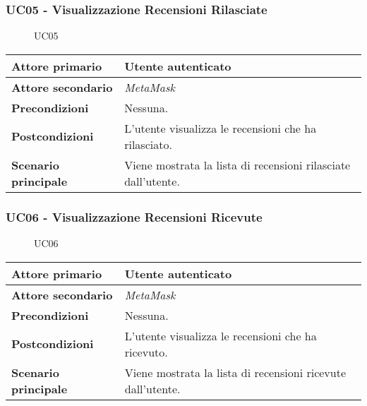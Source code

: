 \subsubsection{UC05 - Visualizzazione Recensioni Rilasciate}
\label{UC05}

\begin{figure}[H]
    \centering
    
    \caption{UC05}
 \end{figure}

\begin{center}
\renewcommand{\arraystretch}{1.5}
\begin{tabular}{ | m{10em} | m{20em} | }
    \hline
    \textbf{Attore primario} & Utente autenticato \\
    \hline
    \textbf{Attore secondario} & \textit{MetaMask} \\
    \hline
    \textbf{Precondizioni} & Nessuna. \\
    \hline
    \textbf{Postcondizioni} & L'utente visualizza le recensioni che ha rilasciato. \\
    \hline
    \textbf{Scenario principale} & Viene mostrata la lista di recensioni rilasciate dall'utente. \\
    \hline
   \end{tabular}
\end{center}

\subsubsection{UC06 - Visualizzazione Recensioni Ricevute}
\label{UC06}

\begin{figure}[H]
    \centering
    
    \caption{UC06}
 \end{figure}

\begin{center}
\renewcommand{\arraystretch}{1.5}
\begin{tabular}{ | m{10em} | m{20em} | }
    \hline
    \textbf{Attore primario} & Utente autenticato \\
    \hline
    \textbf{Attore secondario} & \textit{MetaMask} \\
    \hline
    \textbf{Precondizioni} & Nessuna. \\
    \hline
    \textbf{Postcondizioni} & L'utente visualizza le recensioni che ha ricevuto. \\
    \hline
    \textbf{Scenario principale} & Viene mostrata la lista di recensioni ricevute dall'utente. \\
    \hline
   \end{tabular}
\end{center}


